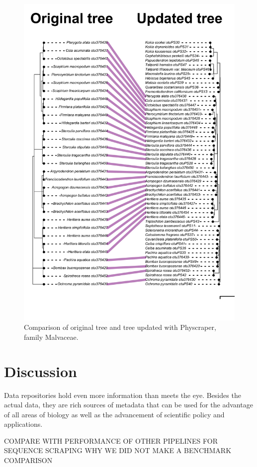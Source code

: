 \documentclass[]{article}
\begin{document}
\begin{figure}

{\centering \includegraphics[width=0.85\linewidth]{docs/figs/cotree-plot2-1} 

}

\caption{Comparison of original tree and tree updated with Physcraper, family Malvaceae.}\label{fig:malvaceae}
\end{figure}
\newpage

\hypertarget{discussion}{%
\section{Discussion}\label{discussion}}

Data repositories hold even more information than meets the eye.
Besides the actual data, they are rich sources of metadata that can be used for the advantage of all areas of biology as well as the advancement of scientific policy and applications.

COMPARE WITH PERFORMANCE OF OTHER PIPELINES FOR SEQUENCE SCRAPING
WHY WE DID NOT MAKE A BENCHMARK COMPARISON
\end{document}
